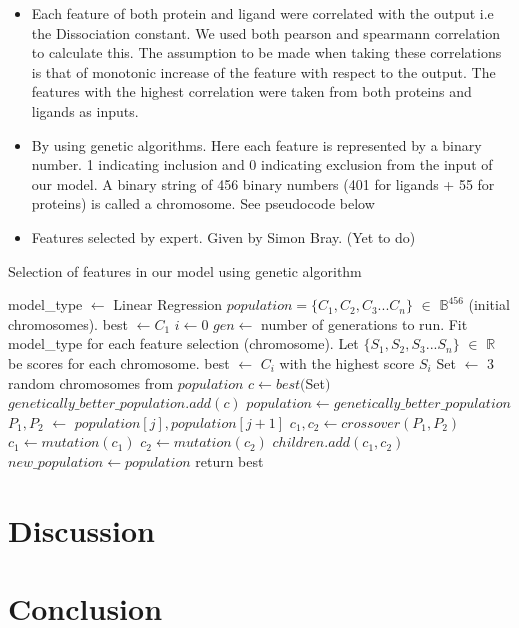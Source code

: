 \documentclass[11pt]{article}
\begin{document}
\begin{itemize}
\item Each feature of both protein and ligand were correlated with the output i.e the Dissociation constant.
We used both pearson and spearmann correlation to calculate this.
The assumption to be made when taking these correlations is that of monotonic increase of
the feature with respect to the output.
The features with the highest correlation were taken from both proteins and ligands as
inputs.
\item By using genetic algorithms\cite{genetic_algorithm}.
Here each feature is represented by a binary number.
1 indicating inclusion and 0 indicating exclusion from the input of our model.
A binary string of 456 binary numbers (401 for ligands + 55 for proteins) is called a chromosome.
See pseudocode below
\item Features selected by expert. Given by Simon Bray. (Yet to do)
\end{itemize}

\label{Genetic_Algo}
\begin{algorithm}
\caption{Selection of features in our model using genetic algorithm \cite{genetic_algorithm}}
\begin{algorithmic}[1]
\State model\_type $\gets$ Linear Regression
\State $ population = \{C_1, C_2, C_3... C_n\}$ $\in$ $\mathbb{B}^{456}$ (initial chromosomes).
\State best $\gets C_1$ 
\State $i \gets 0$
\State $gen \gets$ number of generations to run.
          \State Fit model\_type for each feature selection (chromosome). 
          \State Let $\{S_1, S_2, S_3... S_n\}$ $\in$ $\mathbb{R}$ be scores for each chromosome.
          \State best $\gets$ $C_i$ with the highest score $S_i$
              \State Set $\gets$ 3 random chromosomes from $population$
              \State $c \gets best($Set$)$
              \State $genetically\_better\_population.add(c)$
          \EndFor
          \State $population \gets genetically\_better\_population$
              \State $P_1, P_2$ $\gets$ $population[j], population[j+1]$
              \State $c_1, c_2 \gets crossover(P_1, P_2)$
              \State $c_1 \gets mutation(c_1)$
              \State $c_2 \gets mutation(c_2)$
              \State $children.add(c_1, c_2)$
          \EndFor
      \State $new\_population \gets population$
      \EndFor
\State return best
\EndProcedure
\end{algorithmic}
\end{algorithm}


\section{Discussion}


\section{Conclusion}



\end{document}
